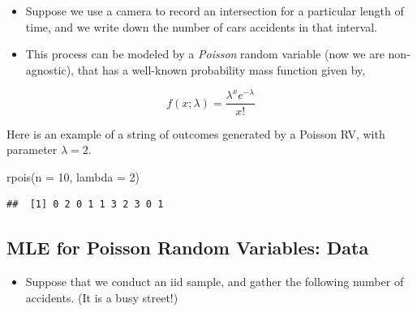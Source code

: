 \documentclass[
]{book}
\newenvironment{Shaded}{\begin{snugshade}}{\end{snugshade}}
\newcommand{\AttributeTok}[1]{\textcolor[rgb]{0.77,0.63,0.00}{#1}}
\newcommand{\DecValTok}[1]{\textcolor[rgb]{0.00,0.00,0.81}{#1}}
\newcommand{\FunctionTok}[1]{\textcolor[rgb]{0.00,0.00,0.00}{#1}}
\newcommand{\NormalTok}[1]{#1}
\providecommand{\tightlist}{%
  \setlength{\itemsep}{0pt}\setlength{\parskip}{0pt}}
\theoremstyle{definition}
\theoremstyle{definition}
\theoremstyle{definition}
\theoremstyle{definition}
\theoremstyle{remark}
\begin{document}
\begin{itemize}
\tightlist
\item
  Suppose we use a camera to record an intersection for a particular length of time, and we write down the number of cars accidents in that interval.\\
\item
  This process can be modeled by a \emph{Poisson} random variable (now we are non-agnostic), that has a well-known probability mass function given by,
\end{itemize}

\[
f(x;\lambda) = \frac{\lambda^x e^{-\lambda}}{x!}
\]

Here is an example of a string of outcomes generated by a Poisson RV, with parameter \(\lambda = 2\).

\begin{Shaded}
\begin{Highlighting}[]
\FunctionTok{rpois}\NormalTok{(}\AttributeTok{n =} \DecValTok{10}\NormalTok{, }\AttributeTok{lambda =} \DecValTok{2}\NormalTok{)}
\end{Highlighting}
\end{Shaded}

\begin{verbatim}
##  [1] 0 2 0 1 1 3 2 3 0 1
\end{verbatim}

\hypertarget{mle-for-poisson-random-variables-data}{%
\subsection{MLE for Poisson Random Variables: Data}\label{mle-for-poisson-random-variables-data}}

\begin{itemize}
\tightlist
\item
  Suppose that we conduct an iid sample, and gather the following number of accidents. (It is a busy street!)
\end{itemize}
\end{document}
